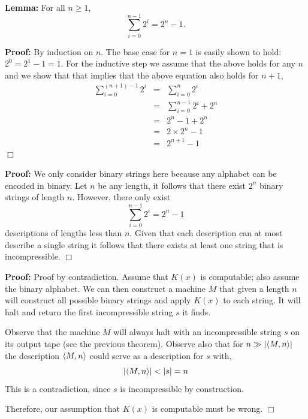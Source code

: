 \documentclass[a4paper,blends,pdf,colorBG,slideColor]{prosper}
\begin{document}
{\bf Lemma:} For all $n \ge 1$,
\[
\sum^{n-1}_{i = 0} 2^i = 2^n -1.
\]

{\bf Proof:} By induction on $n$.  The base case for $n = 1$ is easily shown to hold: $2^0 = 2^1 - 1 = 1$.
For the inductive step we assume that the above holds for any $n$ and we show that that implies that
the above equation also holds for $n+1$,
\begin{eqnarray*}
\sum^{(n+1)-1}_{i = 0} 2^i &=& \sum^{n}_{i = 0} 2^i\\
	&=&\sum^{n-1}_{i = 0} 2^i + 2^n \\
	&=& 2^n -1 + 2^n\\
	&=& 2\times2^n -1\\
	&=& 2^{n+1}-1
\end{eqnarray*}
$\Box$
\es


{\bf Proof:} We only consider binary strings here because any alphabet can be encoded in binary.  Let $n$ be any length,  it follows that there exist
$2^n$ binary strings of length $n$.  However, there only exist
\[
\sum^{n-1}_{i = 0} 2^i = 2^n -1
\]
descriptions of lengths less than $n$.  Given that each description can at most describe
a single string it follows that there exists at least one string that is incompressible.
$\Box$
\es



{\bf Proof:} Proof by contradiction.  Assume that $K(x)$ is computable; also assume the binary alphabet.
We can then construct a machine $M$ 
that given a length $n$ will construct all possible binary strings and apply $K(x)$ to each string.
It will halt and return the first incompressible string $s$ it finds.

Observe that the machine $M$ will always halt with an incompressible string $s$ on its output tape (see the previous
theorem).  Observe also that for $n \gg {|{\ensuremath{\langle {M,n} \rangle}}|}$ the description $\langle {M,n} \rangle$  could serve as a description
for $s$ with,
\[
{|{\langle {M,n} \rangle}|} < {|{s}|} = n
\]
This is a contradiction, since $s$ is incompressible by construction.

Therefore, our assumption that $K(x)$ is computable must be wrong.
$\Box$
\es
\end{document}
